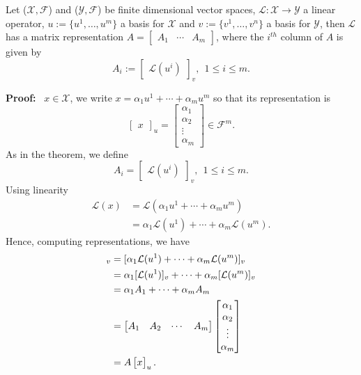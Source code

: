 \vspace*{.2in}

\begin{thm}
\label{thm:MatrixRep}
Let ($\mathcal{X}, \mathcal{F}$) and ($\mathcal{Y}, \mathcal{F}$) be finite dimensional vector spaces, $\mathcal{L}: \mathcal{X} \rightarrow \mathcal{Y}$ a linear operator, $u:=\{u^1,  \ldots,u^m\}$ a basis for $\mathcal{X}$ and $v:=\{v^1,  \ldots,v^n\}$ a basis for $\mathcal{Y}$, then $\mathcal{L}$ has a matrix representation $A = \begin{bmatrix} A_1 & \dotsb & A_m \end{bmatrix}$, where the $i^{th}$ column of $A$ is given by $$A_i := \begin{bmatrix}\mathcal{L}(u^i)\end{bmatrix}_v, ~~1 \le i \le m.$$
\end{thm}

\textbf{Proof:}~ $x \in \mathcal{X}$, we write $x = \alpha_1 u^1 + \dotsb + \alpha_m u^m $ so that its representation is
$$\begin{bmatrix}x\end{bmatrix}_u = \begin{bmatrix}\alpha_1 \\ \alpha_2 \\ \vdots \\ \alpha_m \end{bmatrix}\in \mathcal{F}^m.$$
As in the theorem, we define $$A_i = \begin{bmatrix}\mathcal{L}(u^i)\end{bmatrix}_v, ~~1 \le i \le m.$$
Using linearity
    \begin{align*}
        \mathcal{L}(x) &= \mathcal{L}(\alpha_1 u^1 + \dotsb + \alpha_m u^m)\\
        &= \alpha_1 \mathcal{L}(u^1) + \dotsb + \alpha_m \mathcal{L}(u^m).
    \end{align*}
Hence, computing representations, we have
    \begin{align*}
        [\mathcal{L}(x)]_v  &= [\alpha_1 \mathcal{L}(u^1) + \dotsb + \alpha_m \mathcal{L}(u^m) ]_v \medskip\\
        & = \alpha_1 [\mathcal{L}(u^1)]_v + \cdots  + \alpha_m [\mathcal{L}(u^m)]_v \medskip \\
        &= \alpha_1 A_1 + \cdots + \alpha_m A_m \\
        & = \begin{bmatrix} A_1 & A_2 & \dotsb &A_m \end{bmatrix} \begin{bmatrix}\alpha_1 \\ \alpha_2 \\ \vdots \\ \alpha_m \end{bmatrix} \\
        &= A \begin{bmatrix} x \end{bmatrix}_u.
    \end{align*}

